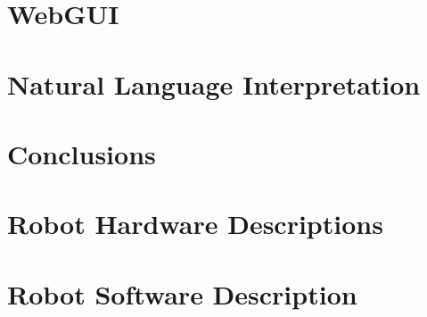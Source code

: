 \documentclass[runningheads,a4paper]{llncs}
\begin{document}
\section{WebGUI}\label{sec:webgui}

 
\section{Natural Language Interpretation}\label{sec:nli} 


%
%
%
%
%

\section{Conclusions}


\section*{Robot Hardware Descriptions}


\section*{Robot Software Description}

\end{document}
